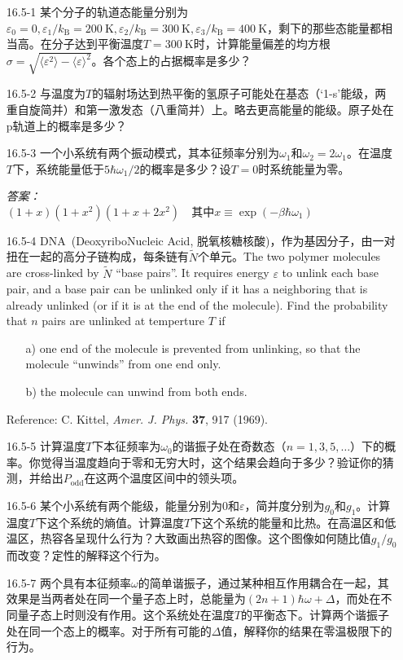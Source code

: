 \begin{itemize}
\item[16.5-1] 某个分子的轨道态能量分别为$\varepsilon_0=0,\varepsilon_1/k_\text{B}=\SI{200}{\kelvin},\varepsilon_2/k_\text{B}=\SI{300}{\kelvin},\varepsilon_3/k_\text{B}=\SI{400}{\kelvin}$，剩下的那些态能量都相当高。在分子达到平衡温度$T=\SI{300}{\kelvin}$时，计算能量偏差的均方根$\sigma=\sqrt{\langle\varepsilon^2\rangle-\langle\varepsilon\rangle^2}$。各个态上的占据概率是多少？
\item[16.5-2] 与温度为$T$的辐射场达到热平衡的氢原子可能处在基态（`1-s'能级，两重自旋简并）和第一激发态（八重简并）上。略去更高能量的能级。原子处在p轨道上的概率是多少？
\item[16.5-3] 一个小系统有两个振动模式，其本征频率分别为$\omega_1$和$\omega_2=2\omega_1$。在温度$T$下，系统能量低于$5\hbar\omega_1/2$的概率是多少？设$T=0$时系统能量为零。
\begin{flushright}
\it 答案：\\
$(1+x)(1+x^2)(1+x+2x^2)\quad \text{其中}x\equiv \exp(-\beta\hbar\omega_1)$
\end{flushright}
\item[16.5-4] DNA~(DeoxyriboNucleic Acid, 脱氧核糖核酸)，作为基因分子，由一对扭在一起的高分子链构成，每条链有$\tilde N$个单元。The two polymer molecules are cross-linked by $\tilde N$ ``base pairs''. It requires energy $\varepsilon$ to unlink each base pair, and a base pair can be unlinked only if it has a neighboring that is already unlinked (or if it is at the end of the molecule). Find the probability that $n$ pairs are unlinked at temperture $T$ if
	\begin{itemize}
	\item[a)] one end of the molecule is prevented from unlinking, so that the molecule ``unwinds'' from one end only.
	\item[b)] the molecule can unwind from both ends.
	\end{itemize}
	Reference: C. Kittel, {\it Amer. J. Phys.} {\bf 37}, 917 (1969).
\item[16.5-5] 计算温度$T$下本征频率为$\omega_0$的谐振子处在奇数态（$n=1,3,5,\dots$）下的概率。你觉得当温度趋向于零和无穷大时，这个结果会趋向于多少？验证你的猜测，并给出$P_\text{odd}$在这两个温度区间中的领头项。
\item[16.5-6] 某个小系统有两个能级，能量分别为$0$和$\varepsilon$，简并度分别为$g_0$和$g_1$。计算温度$T$下这个系统的熵值。计算温度$T$下这个系统的能量和比热。在高温区和低温区，热容各呈现什么行为？大致画出热容的图像。这个图像如何随比值$g_1/g_0$而改变？定性的解释这个行为。
\item[16.5-7] 两个具有本征频率$\omega$的简单谐振子，通过某种相互作用耦合在一起，其效果是当两者处在同一个量子态上时，总能量为$(2n+1)\hbar\omega+\Delta$，而处在不同量子态上时则没有作用。这个系统处在温度$T$的平衡态下。计算两个谐振子处在同一个态上的概率。对于所有可能的$\Delta$值，解释你的结果在零温极限下的行为。
\end{itemize}
